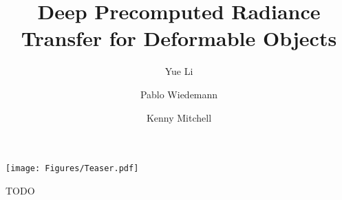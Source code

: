 \documentclass[sigconf]{acmart}
\begin{document}
\title{Deep Precomputed Radiance Transfer for Deformable Objects}

\author{Yue Li}

\author{Pablo Wiedemann}

\author{Kenny Mitchell}


\renewcommand{\shortauthors}{Li, Wiedemann,Mitchell}



%
\begin{teaserfigure}
  \centering
  \texttt{[image: Figures/Teaser.pdf]}
  \label{Fig: Teaser}
  \caption{TODO}
\end{teaserfigure}
\maketitle
%
%

%

%

%

%

%


%
%
\end{document}

